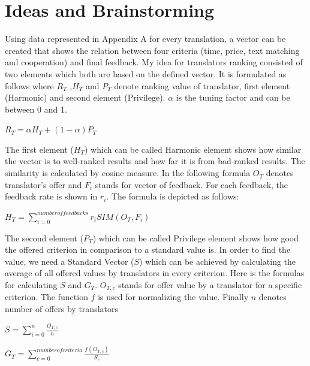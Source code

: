 \section{Ideas and Brainstorming}
Using data represented in Appendix A for every translation, a vector can be created that shows the relation between four criteria (time, price, text matching and cooperation) and final feedback. My idea for translators ranking consisted of two elements which both are based on the defined vector. It is formulated as follows where $R_T$ ,$H_T$ and $P_T$ denote ranking value of translator, first element (Harmonic) and second element (Privilege). $\alpha$ is the tuning factor and can be between 0 and 1.

\begin{center}
$R_T = \alpha H_T + (1-\alpha)P_T$ \\
\end{center}

The first element ($H_T$) which can be called Harmonic element shows how similar the vector is to well-ranked results and how far it is from bad-ranked results. The similarity is calculated by cosine measure. In the following formula $O_T$ denotes translator's offer and $F_i$ stands for vector of feedback. For each feedback, the feedback rate is shown in $r_i$. The formula is depicted as follows:

\begin{center}
$H_T = \sum_{i=0}^{number of feedbacks} r_i SIM(O_T, F_i)$ \\
\end{center}

The second element ($P_T$) which can be called Privilege element shows how good the offered criterion in comparison to a standard value is. In order to find the value, we need a Standard Vector ($S$) which can be achieved by calculating the average of all offered values by translators in every criterion. Here is the formulas for calculating $S$ and $G_T$. $O_{T,c}$ stands for offer value by a translator for a specific criterion. The function $f$ is used for normalizing the value. Finally $n$ denotes number of offers by translators 

\begin{center}
$S = \sum_{i=0}^{n} \frac{O_{T,c}}{n}$ \\
\end{center}

\begin{center}
$G_T = \sum_{c=0}^{number of criteria} \frac{f(O_{T,c})}{S_c} $ \\
\end{center}

